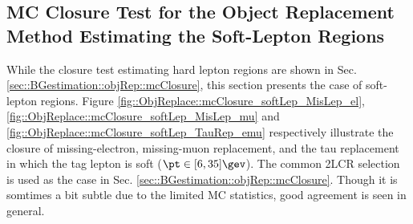 \clearpage
\subsection{MC Closure Test for the Object Replacement Method Estimating the Soft-Lepton Regions} \label{sec::App::objRep_closure_softLep}
While the closure test estimating hard lepton regions are shown in Sec. \ref{sec::BGestimation::objRep::mcClosure}, this section presents the case of soft-lepton regions. 
Figure \ref{fig::ObjReplace::mcClosure_softLep_MisLep_el}, \ref{fig::ObjReplace::mcClosure_softLep_MisLep_mu} and \ref{fig::ObjReplace::mcClosure_softLep_TauRep_emu} respectively illustrate the closure of missing-electron, missing-muon replacement, and the tau replacement in which the tag lepton is soft ($\pt\in[6,35]\gev$). The common 2LCR selection is used as the case in Sec. \ref{sec::BGestimation::objRep::mcClosure}. Though it is somtimes a bit subtle due to the limited MC statistics, good agreement is seen in general.







%
